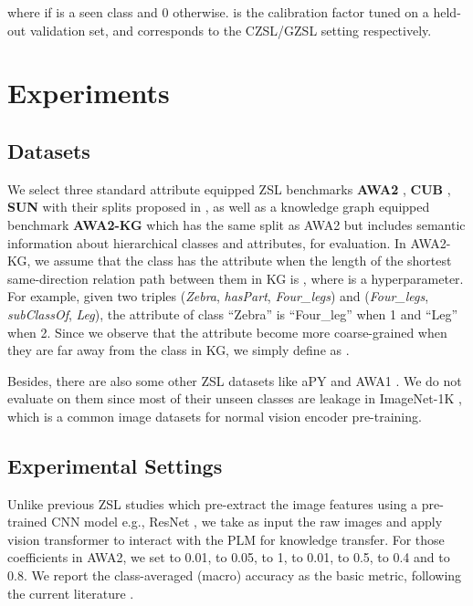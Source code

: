 \documentclass[letterpaper]{article} \usepackage{aaai23}  \usepackage{times}  \usepackage{helvet}  \usepackage{courier}  \usepackage[hyphens]{url}  \usepackage{graphicx} \urlstyle{rm} \def\UrlFont{\rm}  \usepackage{natbib}  \usepackage{caption} \frenchspacing  \setlength{\pdfpagewidth}{8.5in}  \setlength{\pdfpageheight}{11in}  \usepackage{algorithm}
\newcommand{\hyf}[1]{{\color{black}#1}}
\newcommand{\fy}[1]{{\color{black}#1}}
\newcommand{\jeff}[1]{{\color{black}#1}}
\begin{document}
where  if  is a seen class and 0 otherwise.  is the calibration factor tuned on a held-out validation set, and   corresponds to the CZSL/GZSL setting respectively.




\section{Experiments}
\subsection{Datasets}

{We select three standard attribute equipped ZSL benchmarks \textbf{AWA2} \cite{DBLP:journals/pami/XianLSA19}, \textbf{CUB} \cite{welinder2010caltech}, \textbf{SUN} \cite{DBLP:conf/cvpr/PattersonH12} with their splits proposed in \cite{DBLP:journals/pami/XianLSA19}, as well as a knowledge graph equipped benchmark \textbf{AWA2-KG} which has the same split as AWA2 but includes semantic information about hierarchical classes and attributes, for evaluation. 
In AWA2-KG,}
we assume \fy{that} the class  \fy{has} the attribute  when the length of the shortest same-direction relation path between \fy{them} in KG is , where  is a hyperparameter. 
For example, given two triples (\textit{Zebra}, \textit{hasPart}, \textit{Four_legs}) and (\textit{Four_legs}, \textit{subClassOf}, \textit{Leg}), the attribute of class ``Zebra'' is ``Four\_leg'' when 1 and ``Leg'' when 2.
{\fy{Since we observe that the attribute  become more coarse-grained when they are far away from the class  in KG, we simply define  as .}}

Besides, there are also some other 
ZSL datasets like aPY \cite{DBLP:conf/cvpr/FarhadiEHF09} and AWA1 \cite{DBLP:journals/pami/LampertNH14}.  \jeff{We} do not evaluate on them since most of their unseen classes are leakage \cite{DBLP:journals/pami/XianLSA19}  in ImageNet-1K \cite{DBLP:conf/cvpr/DengDSLL009}, which is a common image datasets for normal vision encoder pre-training. 

\subsection{Experimental Settings}
Unlike previous ZSL studies which pre-extract the image features using a pre-trained CNN model e.g., ResNet \cite{DBLP:conf/cvpr/HeZRS16}, we take as input the raw images and apply vision transformer to 
interact with the PLM for knowledge transfer.
For those coefficients in AWA2, we set  to \hyf{0.01},  to \hyf{0.05},  to \hyf{1},  to 0.01,   to 0.5,  to 0.4 and  to 0.8. 
{We report the class-averaged (macro) accuracy as the basic metric, following the current literature \cite{DBLP:conf/nips/XuXWSA20,Chen2021TransZero}.}
\end{document}
